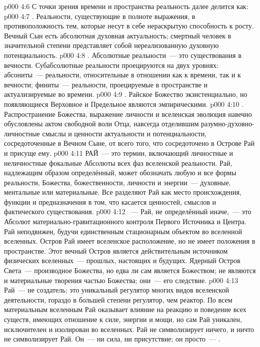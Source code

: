 \vs p000 4:6 \pc С точки зрения времени и пространства реальность далее делится как:
\vs p000 4:7 . Реальности, существующие в полноте выражения, в противоположность тем, которые несут в себе нераскрытую способность к росту. Вечный Сын есть абсолютная духовная актуальность; смертный человек в значительной степени представляет собой нереализованную духовную потенциальность.
\vs p000 4:8 . Абсолютные реальности~--- это существования в вечности. Субабсолютные реальности проецируются на двух уровнях: абсониты~--- реальности, относительные в отношении как к времени, так и к вечности; финиты~--- реальности, проецируемые в пространстве и актуализируемые во времени.
\vs p000 4:9 . Райское Божество экзистенциально, но появляющиеся Верховное и Предельное являются эмпирическими.
\vs p000 4:10 . Распространение Божества, выражение личности и вселенская эволюция навечно обусловлены актом свободной воли Отца, навсегда отделившим разумно\hyp{}духовно\hyp{}личностные смыслы и ценности актуальности и потенциальности, сосредоточенные в Вечном Сыне, от всего того, что сосредоточено в Острове Рай и присуще ему.
\vs p000 4:11 \pc РАЙ~--- это термин, включающий личностные и неличностные фокальные Абсолюты всех фаз вселенской реальности. Рай, надлежащим образом определённый, может обозначать любую и все формы реальности, Божества, божественности, личности и энергии~--- духовные, ментальные или материальные. Все разделяют Рай как место происхождения, функции и предназначения в том, что касается ценностей, смыслов и фактического существования.
\vs p000 4:12 \pc {}~--- Рай, не определённый иначе,~--- это Абсолют материально\hyp{}гравитационного контроля Первого Источника и Центра. Рай неподвижен, будучи единственным стационарным объектом во вселенной вселенных. Остров Рай имеет вселенское расположение, но не имеет положения в пространстве. Этот вечный Остров является действительным источником физических вселенных~--- прошлых, настоящих и будущих. Ядерный Остров Света~--- производное Божества, но едва ли сам является Божеством; не являются и материальные творения частью Божества; они~--- его следствие.
\vs p000 4:13 Рай~--- не создатель; это уникальный регулятор многих видов вселенской деятельности, гораздо в большей степени регулятор, чем реактор. По всем материальным вселенным Рай оказывает влияние на реакцию и поведение всех существ, имеющих отношение к силе, энергии и мощи, но сам Рай уникален, исключителен и изолирован во вселенных. Рай не символизирует ничего, и ничто не символизирует Рай. Он~--- ни сила, ни присутствие; он просто~--- .
